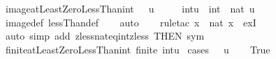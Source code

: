 \begin{isabellebody}
%
\endisadelimdocument
{}\isamarkupfalse%
\ image{\isacharunderscore}{\kern0pt}atLeastZeroLessThan{\isacharunderscore}{\kern0pt}int{\isacharcolon}{\kern0pt}\ {\isachardoublequoteopen}{}\ {\isasymle}\ u\ {\isacharequal}{\kern0pt}{\isacharequal}{\kern0pt}{\isachargreater}{\kern0pt}\isanewline
\ \ \ \ {\isacharbraceleft}{\kern0pt}{\isacharparenleft}{\kern0pt}{}{\isacharcolon}{\kern0pt}{\isacharcolon}{\kern0pt}int{\isacharparenright}{\kern0pt}{\isachardot}{\kern0pt}{\isachardot}{\kern0pt}{\isacharless}{\kern0pt}u{\isacharbraceright}{\kern0pt}\ {\isacharequal}{\kern0pt}\ int\ {\isacharbackquote}{\kern0pt}\ {\isacharbraceleft}{\kern0pt}{\isachardot}{\kern0pt}{\isachardot}{\kern0pt}{\isacharless}{\kern0pt}nat\ u{\isacharbraceright}{\kern0pt}{\isachardoublequoteclose}\isanewline
%
\isadelimproof
\ \ %
\endisadelimproof
%
\isatagproof
{}\isamarkupfalse%
\ image{\isacharunderscore}{\kern0pt}def\ lessThan{\isacharunderscore}{\kern0pt}def\isanewline
\ \ \isamarkupfalse%
\ auto\isanewline
\ \ \isamarkupfalse%
\ {\isacharparenleft}{\kern0pt}rule{\isacharunderscore}{\kern0pt}tac\ x\ {\isacharequal}{\kern0pt}\ {\isachardoublequoteopen}nat\ x{\isachardoublequoteclose}\ \ exI{\isacharparenright}{\kern0pt}\isanewline
\ \ \isamarkupfalse%
\ {\isacharparenleft}{\kern0pt}auto\ simp\ add{\isacharcolon}{\kern0pt}\ zless{\isacharunderscore}{\kern0pt}nat{\isacharunderscore}{\kern0pt}eq{\isacharunderscore}{\kern0pt}int{\isacharunderscore}{\kern0pt}zless\ {\isacharbrackleft}{\kern0pt}THEN\ sym{\isacharbrackright}{\kern0pt}{\isacharparenright}{\kern0pt}\isanewline
\ \ \isamarkupfalse%
%
\endisatagproof
{\isafoldproof}%
%
\isadelimproof
\isanewline
%
\endisadelimproof
\isanewline
{}\isamarkupfalse%
\ finite{\isacharunderscore}{\kern0pt}atLeastZeroLessThan{\isacharunderscore}{\kern0pt}int{\isacharcolon}{\kern0pt}\ {\isachardoublequoteopen}finite\ {\isacharbraceleft}{\kern0pt}{\isacharparenleft}{\kern0pt}{}{\isacharcolon}{\kern0pt}{\isacharcolon}{\kern0pt}int{\isacharparenright}{\kern0pt}{\isachardot}{\kern0pt}{\isachardot}{\kern0pt}{\isacharless}{\kern0pt}u{\isacharbraceright}{\kern0pt}{\isachardoublequoteclose}\isanewline
%
\isadelimproof
%
\endisadelimproof
%
\isatagproof
{}\isamarkupfalse%
\ {\isacharparenleft}{\kern0pt}cases\ {\isachardoublequoteopen}{}\ {\isasymle}\ u{\isachardoublequoteclose}{\isacharparenright}{\kern0pt}\isanewline
\ \ \isamarkupfalse%
\ True\isanewline

\end{isabellebody}
